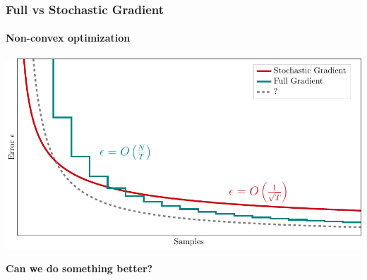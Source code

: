 \documentclass[aspectratio=169]{beamer}
\newcommand{\enb}[1]{\textcolor{poliblue1}{\textbf{#1}}}
\begin{document}
\begin{frame} 
\frametitle{Full vs Stochastic Gradient}
\framesubtitle{Non-convex optimization}
\begin{center}
	\includegraphics[width=.75\paperwidth]{convergence.pdf}
\end{center}

\vspace*{-.6cm}
\Large{\enb{Can we do something better?}}
\end{frame}
\end{document}
